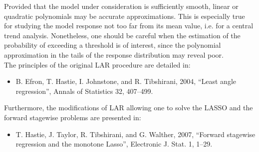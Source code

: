 {
Provided that the model under consideration is sufficiently smooth, linear or quadratic polynomials may be accurate approximations. This is especially true for studying the model response not too far from its mean value, i.e. for a central trend analysis. Nonetheless, one should be careful when the estimation of the probability of exceeding a threshold is of interest, since the polynomial approximation in the tails of the response distribution may reveal poor. \\

The principles of the original LAR procedure are detailed in:
\begin{itemize}
  \item B. Efron, T. Hastie, I. Johnstone, and R. Tibshirani, 2004, ``Least angle regression'', Annals of
Statistics 32, 407--499.
\end{itemize}
Furthermore, the modifications of LAR allowing one to solve the LASSO and the forward stagewise problems are presented in:
\begin{itemize}
  \item T. Hastie, J. Taylor, R. Tibshirani, and G. Walther, 2007, ``Forward stagewise regression and
the monotone Lasso'', Electronic J. Stat. 1, 1--29.
\end{itemize}
}


